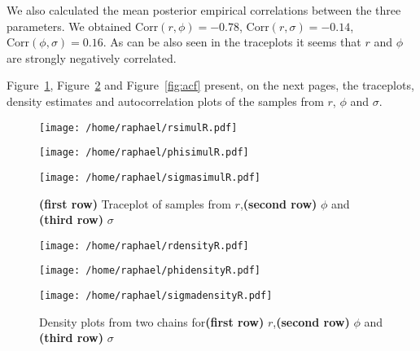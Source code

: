\documentclass{article}
\begin{document}
We also calculated the mean posterior empirical correlations between the three parameters. We obtained $\mathrm{Corr}(r, \phi) = -0.78$, $\mathrm{Corr}(r, \sigma) = -0.14$,  $\mathrm{Corr}(\phi, \sigma) = 0.16$. As can be also seen in the traceplots it seems that $r$ and $\phi$ are strongly negatively correlated.


Figure~\ref{fig:samples}, Figure~\ref{fig:densities} and Figure~\ref{fig:acf} present, on the next pages, the traceplots, density estimates and autocorrelation plots of the samples from $r$, $\phi$ and $\sigma$.

	\begin{figure}[htb]
		\centering
		\begin{minipage}{0.6\textwidth}
			\centering
			\texttt{[image: /home/raphael/rsimulR.pdf]}
		\end{minipage}
		\begin{minipage}{0.6\textwidth}
			\centering
			\texttt{[image: /home/raphael/phisimulR.pdf]}
		\end{minipage}
		\begin{minipage}{0.6\textwidth}
			\centering
			\texttt{[image: /home/raphael/sigmasimulR.pdf]}
		\end{minipage}
		\caption{\textbf{(first row)} Traceplot of samples from $r$,\textbf{(second row)} $\phi$ and \textbf{(third row)} $\sigma$}
		\label{fig:samples}
	\end{figure}
	
	\begin{figure}[htb]
		\centering
		\begin{minipage}{0.6\textwidth}
			\centering
			\texttt{[image: /home/raphael/rdensityR.pdf]}
		\end{minipage}
		\begin{minipage}{0.6\textwidth}
			\centering
			\texttt{[image: /home/raphael/phidensityR.pdf]}
		\end{minipage}
		\begin{minipage}{0.6\textwidth}
			\centering
			\texttt{[image: /home/raphael/sigmadensityR.pdf]}
		\end{minipage}
		\caption{Density plots from two chains for\textbf{(first row)} $r$,\textbf{(second row)} $\phi$ and \textbf{(third row)} $\sigma$}
		\label{fig:densities}
	\end{figure}
	
\end{document}
